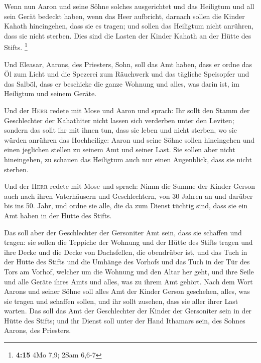  Wenn nun Aaron und seine Söhne solches ausgerichtet und
das Heiligtum und all sein Gerät bedeckt haben, wenn das Heer aufbricht,
darnach sollen die Kinder Kahath hineingehen, dass sie es tragen; und
sollen das Heiligtum nicht anrühren, dass sie nicht sterben. Dies sind
die Lasten der Kinder Kahath an der Hütte des Stifts. \footnote{\textbf{4:15}
  4Mo 7,9; 2Sam 6,6-7}

 Und Eleasar, Aarons, des Priesters, Sohn, soll das Amt
haben, dass er ordne das Öl zum Licht und die Spezerei zum Räuchwerk und
das tägliche Speisopfer und das Salböl, dass er beschicke die ganze
Wohnung und alles, was darin ist, im Heiligtum und seinem Geräte.

 Und der \textsc{Herr} redete mit Mose und Aaron und
sprach:  Ihr sollt den Stamm der Geschlechter der
Kahathiter nicht lassen sich verderben unter den Leviten;
 sondern das sollt ihr mit ihnen tun, dass sie leben und
nicht sterben, wo sie würden anrühren das Hochheilige: Aaron und seine
Söhne sollen hineingehen und einen jeglichen stellen zu seinem Amt und
seiner Last.  Sie sollen aber nicht hineingehen, zu
schauen das Heiligtum auch nur einen Augenblick, dass sie nicht sterben.

 Und der \textsc{Herr} redete mit Mose und sprach:
 Nimm die Summe der Kinder Gerson auch nach ihren
Vaterhäusern und Geschlechtern,  von 30 Jahren an und
darüber bis ins 50. Jahr, und ordne sie alle, die da zum Dienst tüchtig
sind, dass sie ein Amt haben in der Hütte des Stifts.

 Das soll aber der Geschlechter der Gersoniter Amt sein,
dass sie schaffen und tragen:  sie sollen die Teppiche
der Wohnung und der Hütte des Stifts tragen und ihre Decke und die Decke
von Dachsfellen, die obendrüber ist, und das Tuch in der Hütte des
Stifts  und die Umhänge des Vorhofs und das Tuch in der
Tür des Tors am Vorhof, welcher um die Wohnung und den Altar her geht,
und ihre Seile und alle Geräte ihres Amts und alles, was zu ihrem Amt
gehört.  Nach dem Wort Aarons und seiner Söhne soll alles
Amt der Kinder Gerson geschehen, alles, was sie tragen und schaffen
sollen, und ihr sollt zusehen, dass sie aller ihrer Last warten.
 Das soll das Amt der Geschlechter der Kinder der
Gersoniter sein in der Hütte des Stifts; und ihr Dienst soll unter der
Hand Ithamars sein, des Sohnes Aarons, des Priesters.


